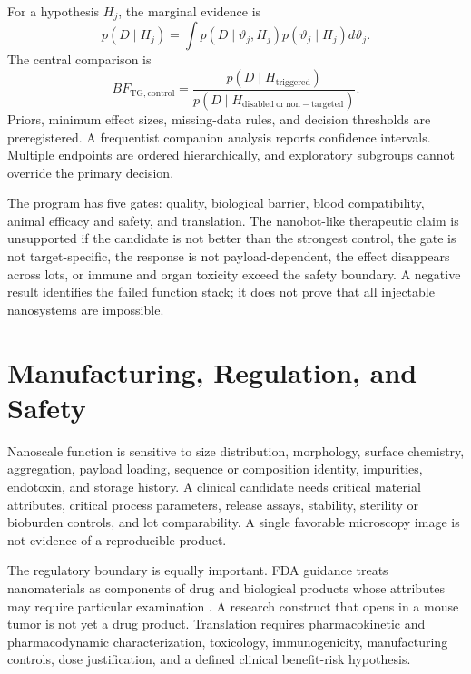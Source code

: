 \documentclass[conference]{IEEEtran}
\begin{document}
For a hypothesis $H_j$, the marginal evidence is
\begin{equation}
p(D\mid H_j)=\int p(D\mid\vartheta_j,H_j)p(\vartheta_j\mid H_j)d\vartheta_j.
\label{eq:marginal}
\end{equation}
The central comparison is
\begin{equation}
BF_{\mathrm{TG,control}}=\frac{p(D\mid H_{\mathrm{triggered}})}{p(D\mid H_{\mathrm{disabled\ or\ non-targeted}})}.
\label{eq:bf}
\end{equation}
Priors, minimum effect sizes, missing-data rules, and decision thresholds are preregistered. A frequentist companion analysis reports confidence intervals. Multiple endpoints are ordered hierarchically, and exploratory subgroups cannot override the primary decision.

The program has five gates: quality, biological barrier, blood compatibility, animal efficacy and safety, and translation. The nanobot-like therapeutic claim is unsupported if the candidate is not better than the strongest control, the gate is not target-specific, the response is not payload-dependent, the effect disappears across lots, or immune and organ toxicity exceed the safety boundary. A negative result identifies the failed function stack; it does not prove that all injectable nanosystems are impossible.

\section{Manufacturing, Regulation, and Safety}
\label{sec:manufacturing}
Nanoscale function is sensitive to size distribution, morphology, surface chemistry, aggregation, payload loading, sequence or composition identity, impurities, endotoxin, and storage history. A clinical candidate needs critical material attributes, critical process parameters, release assays, stability, sterility or bioburden controls, and lot comparability. A single favorable microscopy image is not evidence of a reproducible product.

The regulatory boundary is equally important. FDA guidance treats nanomaterials as components of drug and biological products whose attributes may require particular examination \cite{fda2022}. A research construct that opens in a mouse tumor is not yet a drug product. Translation requires pharmacokinetic and pharmacodynamic characterization, toxicology, immunogenicity, manufacturing controls, dose justification, and a defined clinical benefit-risk hypothesis.
\end{document}
